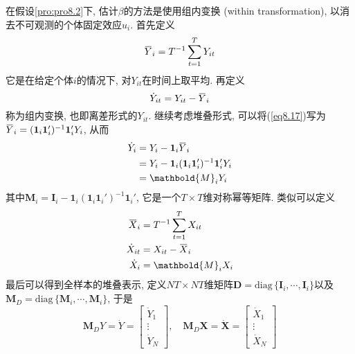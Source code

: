 \documentclass[cn, 12pt, math=mtpro2, bibstyle=apa, blue, twocol]{elegantbook}
\newcommand{\X}{\mathbold{X}}
\newcommand{\overbar}[1]{\mkern 1.5mu\overline{\mkern-1.5mu#1\mkern-1.5mu}\mkern 1.5mu}
\begin{document}
在假设\ref{pro:pro8.2}下, 估计$\beta$的方法是使用组内变换 (within transformation), 以消去不可观测的个体固定效应$u_i$. 首先定义
\begin{equation}\label{eq8.17}
  \overbar{Y}_i=T^{-1}\sum_{t=1}^{T}Y_{it}
\end{equation}
它是在给定个体$i$的情况下, 对$Y_{it}$在时间上取平均. 再定义
$$\dot{Y}_{it}=Y_{it}-\overbar{Y}_i$$
称为组内变换, 也即离差形式的$Y_{it}$. 继续考虑堆叠形式, 可以将(\ref{eq8.17})写为$\overbar{Y}_i=(\mathbf{1}_i\mathbf{1}_i')^{-1}\mathbf{1}_i'Y_i$, 从而
\begin{align*}
\dot{Y}_i&=Y_i-\mathbf{1}_i\overbar{Y}_i \\
&=Y_i-\mathbf{1}_i(\mathbf{1}_i\mathbf{1}_i')^{-1}\mathbf{1}_i'Y_i \\
&=\mathbold{M}_iY_i
\end{align*}
其中$\mathbold{M}_i=\mathbold{I}_i-\mathbf{1}_i(\mathbf{1}_i\mathbf{1}_i')^{-1}\mathbf{1}_i'$, 它是一个$T\times T$维对称幂等矩阵. 类似可以定义
\begin{align*}
\overbar{X}_i&=T^{-1}\sum_{t=1}^{T}X_{it} \\
\dot{X}_{it}&=X_{it}-\overbar{X}_i \\
\dot{X}_i&=\mathbold{M}_iX_i
\end{align*}
最后可以得到全样本的堆叠表示, 定义$NT\times NT$维矩阵$\mathbold{D}=\text{diag}\,\{\mathbold{I}_i,\cdots,\mathbold{I}_i\}$以及$\mathbold{M}_D=\text{diag}\,\{\mathbold{M}_i,\cdots,\mathbold{M}_i\}$, 于是
$$\mathbold{M}_DY=\dot{Y}=\begin{bmatrix}
                            \dot{Y}_1 \\
                            \vdots \\
                            \dot{Y}_N
                          \end{bmatrix},\quad \mathbold{M}_D\X=\dot{\X}=\begin{bmatrix}
                                                                          \dot{X}_1 \\
                                                                          \vdots \\
                                                                          \dot{X}_N
                                                                        \end{bmatrix}$$
\end{document}
